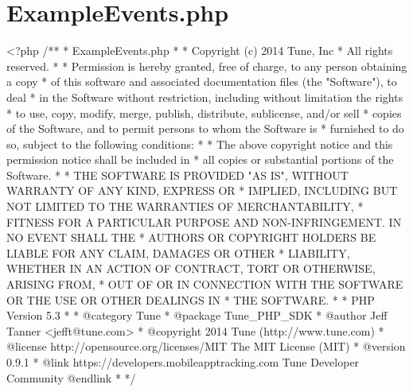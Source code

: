 \hypertarget{ExampleEvents_8php-example}{\section{Example\-Events.\-php}
}

\begin{DoxyCodeInclude}
<?php\textcolor{comment}{}
\textcolor{comment}{/**}
\textcolor{comment}{ * ExampleEvents.php}
\textcolor{comment}{ *}
\textcolor{comment}{ * Copyright (c) 2014 Tune, Inc}
\textcolor{comment}{ * All rights reserved.}
\textcolor{comment}{ *}
\textcolor{comment}{ * Permission is hereby granted, free of charge, to any person obtaining a copy}
\textcolor{comment}{ * of this software and associated documentation files (the "Software"), to deal}
\textcolor{comment}{ * in the Software without restriction, including without limitation the rights}
\textcolor{comment}{ * to use, copy, modify, merge, publish, distribute, sublicense, and/or sell}
\textcolor{comment}{ * copies of the Software, and to permit persons to whom the Software is}
\textcolor{comment}{ * furnished to do so, subject to the following conditions:}
\textcolor{comment}{ *}
\textcolor{comment}{ * The above copyright notice and this permission notice shall be included in}
\textcolor{comment}{ * all copies or substantial portions of the Software.}
\textcolor{comment}{ *}
\textcolor{comment}{ * THE SOFTWARE IS PROVIDED "AS IS", WITHOUT WARRANTY OF ANY KIND, EXPRESS OR}
\textcolor{comment}{ * IMPLIED, INCLUDING BUT NOT LIMITED TO THE WARRANTIES OF MERCHANTABILITY,}
\textcolor{comment}{ * FITNESS FOR A PARTICULAR PURPOSE AND NON-INFRINGEMENT. IN NO EVENT SHALL THE}
\textcolor{comment}{ * AUTHORS OR COPYRIGHT HOLDERS BE LIABLE FOR ANY CLAIM, DAMAGES OR OTHER}
\textcolor{comment}{ * LIABILITY, WHETHER IN AN ACTION OF CONTRACT, TORT OR OTHERWISE, ARISING FROM,}
\textcolor{comment}{ * OUT OF OR IN CONNECTION WITH THE SOFTWARE OR THE USE OR OTHER DEALINGS IN}
\textcolor{comment}{ * THE SOFTWARE.}
\textcolor{comment}{ *}
\textcolor{comment}{ * PHP Version 5.3}
\textcolor{comment}{ *}
\textcolor{comment}{ * @category  Tune}
\textcolor{comment}{ * @package   Tune\_PHP\_SDK}
\textcolor{comment}{ * @author    Jeff Tanner <jefft@tune.com>}
\textcolor{comment}{ * @copyright 2014 Tune (http://www.tune.com)}
\textcolor{comment}{ * @license   http://opensource.org/licenses/MIT The MIT License (MIT)}
\textcolor{comment}{ * @version   0.9.1}
\textcolor{comment}{ * @link      https://developers.mobileapptracking.com Tune Developer Community @endlink}
\textcolor{comment}{ *}
\textcolor{comment}{ */}


\end{DoxyCodeInclude}
